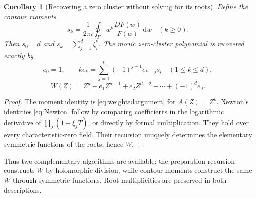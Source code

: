 \documentclass[11pt,letterpaper]{article}
\numberwithin{equation}{section}
\newtheorem{corollary}[corollary]{Corollary}
\theoremstyle{definition}
\theoremstyle{remark}
\newcommand{\dd}{\,\mathrm d}
\begin{document}
\begin{corollary}[Recovering a zero cluster without solving for its roots]
Define the contour moments
\[
 s_k=\frac1{2\pi i}\oint_\Gamma w^k\frac{DF(w)}{F(w)}\dd w
 \quad(k\ge0).
\]
Then $s_0=d$ and $s_k=\sum_{j=1}^d\xi_j^k$. The monic zero-cluster
polynomial is recovered exactly by
\begin{equation}\label{eq:Newton}
 e_0=1,\qquad
 k e_k=\sum_{j=1}^k(-1)^{j-1}e_{k-j}s_j\quad(1\le k\le d),
\end{equation}
\[
 W(Z)=Z^d-e_1Z^{d-1}+e_2Z^{d-2}-\cdots+(-1)^de_d.
\]
\end{corollary}
\begin{proof}
The moment identity is \eqref{eq:weightedargument} for $A(Z)=Z^k$.
Newton's identities \eqref{eq:Newton} follow by comparing coefficients
in the logarithmic derivative of $\prod_j(1+\xi_jT)$, or directly by
formal multiplication. They hold over every characteristic-zero field.
Their recursion uniquely determines the elementary symmetric functions
of the roots, hence $W$.
\end{proof}

Thus two complementary algorithms are available: the preparation
recursion constructs $W$ by holomorphic division, while contour moments
construct the same $W$ through symmetric functions. Root multiplicities
are preserved in both descriptions.
\end{document}
